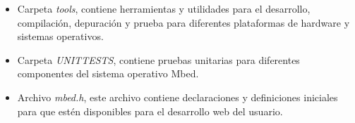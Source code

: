 \begin{itemize}
    \item Carpeta \textit{tools}, contiene herramientas y utilidades para el desarrollo, compilación, depuración y prueba para diferentes plataformas de hardware y sistemas operativos.

    \item Carpeta \textit{UNITTESTS}, contiene pruebas unitarias para diferentes componentes del sistema operativo Mbed.

    \item Archivo \textit{mbed.h}, este archivo contiene declaraciones y definiciones iniciales para que estén disponibles para el desarrollo web del usuario. 

\end{itemize}
